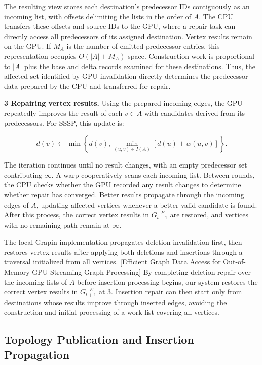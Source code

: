 The resulting view stores each destination's predecessor IDs contiguously as an incoming list, with offsets delimiting the lists in the order of $A$. The CPU transfers these offsets and source IDs to the GPU, where a repair task can directly access all predecessors of its assigned destination. Vertex results remain on the GPU. If $M_A$ is the number of emitted predecessor entries, this representation occupies $O(|A|+M_A)$ space. Construction work is proportional to $|A|$ plus the base and delta records examined for these destinations. Thus, the affected set identified by GPU invalidation directly determines the predecessor data prepared by the CPU and transferred for repair.

\textbf{3 Repairing vertex results.} Using the prepared incoming edges, the GPU repeatedly improves the result of each $v\in A$ with candidates derived from its predecessors. For SSSP, this update is:

\begin{equation}
d(v)\leftarrow\min\left\{d(v),
\min_{(u,v)\in I(A)}[d(u)+w(u,v)]\right\}.
\tag{5.2}
\end{equation}

The iteration continues until no result changes, with an empty predecessor set contributing $\infty$. A warp cooperatively scans each incoming list. Between rounds, the CPU checks whether the GPU recorded any result changes to determine whether repair has converged. Better results propagate through the incoming edges of $A$, updating affected vertices whenever a better valid candidate is found. After this process, the correct vertex results in $G_{t+1}^{-E}$ are restored, and vertices with no remaining path remain at $\infty$.

The local Grapin implementation propagates deletion invalidation first, then restores vertex results after applying both deletions and insertions through a traversal initialized from all vertices. [Efficient Graph Data Access for Out-of-Memory GPU Streaming Graph Processing] By completing deletion repair over the incoming lists of $A$ before insertion processing begins, our system restores the correct vertex results in $G_{t+1}^{-E}$ at 3. Insertion repair can then start only from destinations whose results improve through inserted edges, avoiding the construction and initial processing of a work list covering all vertices.

\subsection{Topology Publication and Insertion Propagation}


